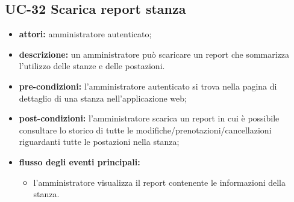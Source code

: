 \subsection{UC-32 Scarica report stanza}
\begin{itemize}
    \item \textbf{attori:} amministratore autenticato;
    \item \textbf{descrizione:} un amministratore pu\`{o} scaricare un report che sommarizza l'utilizzo delle stanze e delle postazioni.
    \item \textbf{pre-condizioni:} l'amministratore autenticato si trova nella pagina di dettaglio di una stanza nell'applicazione web;
    \item \textbf{post-condizioni:} l'amministratore scarica un report in cui \`{e} possibile consultare lo storico di tutte le modifiche/prenotazioni/cancellazioni riguardanti tutte le postazioni nella stanza;
    \item \textbf{flusso degli eventi principali:}
    \begin{itemize}
        \item l'amministratore visualizza il report contenente le informazioni della stanza.
    \end{itemize}
\end{itemize}